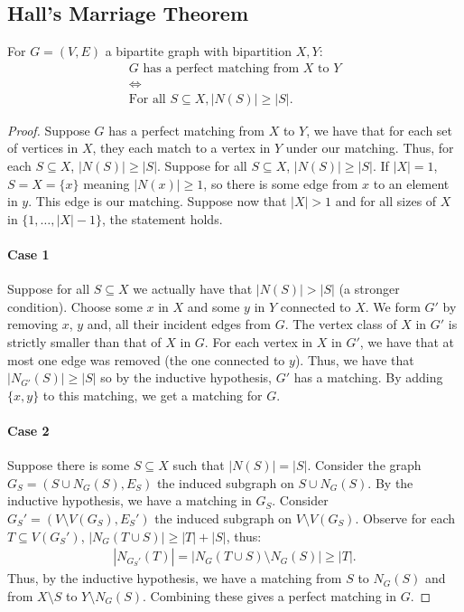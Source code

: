 \newpage

\subsection{Hall's Marriage Theorem}

For $G = (V, E)$ a bipartite graph with bipartition $X, Y$: \begin{gather*}
  G \text{ has a perfect matching from } X \text{ to } Y \\
  \Longleftrightarrow \\
  \text{For all } S \subseteq X, |N(S)| \geq |S|.
\end{gather*}
\begin{proof}
  Suppose $G$ has a perfect matching from $X$ to $Y$, we have that
  for each set of vertices in $X$, they each match to a
  vertex in $Y$ under our matching. Thus, for each $S \subseteq X$,
  $|N(S)| \geq |S|$. Suppose for all $S \subseteq X$, 
  $|N(S)| \geq |S|$. If $|X| = 1$, $S = X = \{x\}$ meaning
  $|N(x)| \geq 1$, so there is some edge from $x$ to an
  element in $y$. This edge is our matching.
  Suppose now that $|X| > 1$ and for all sizes of $X$ in
  $\{1, \ldots, |X| - 1\}$, the statement holds.
  \paragraph{Case 1}
  Suppose for all $S \subseteq X$ we actually have that 
  $|N(S)| > |S|$ (a stronger condition). Choose some
  $x$ in $X$ and some $y$ in $Y$ connected to $X$. We
  form $G'$ by removing $x$, $y$ and, all their incident
  edges from $G$. The vertex class of $X$ in $G'$
  is strictly smaller than that of $X$ in $G$. For
  each vertex in $X$ in $G'$, we have that at most
  one edge was removed (the one connected to $y$).
  Thus, we have that $|N_{G'}(S)| \geq |S|$ so by the
  inductive hypothesis, $G'$ has a matching. By adding
  $\{x, y\}$ to this matching, we get a matching for $G$.
  \paragraph{Case 2}
  Suppose there is some $S \subseteq X$ such that $|N(S)| = |S|$.
  Consider the graph $G_S = (S \cup N_G(S), E_S)$ the induced
  subgraph on $S \cup N_G(S)$. By the inductive hypothesis,
  we have a matching in $G_S$. Consider 
  $G_S' = (V \setminus V(G_S), E_S')$ the induced subgraph on
  $V \setminus V(G_S)$. Observe for each $T \subseteq V(G_S')$,
  $|N_G(T \cup S)| \geq |T| + |S|$, thus: \begin{gather*}
      |N_{G_S'}(T)| = |N_G(T \cup S) \setminus N_G(S)| \geq |T|.
  \end{gather*} Thus, by the inductive hypothesis, we have a matching
  from $S$ to $N_G(S)$ and from $X \setminus S$ to $Y \setminus N_G(S)$.
  Combining these gives a perfect matching in $G$. 
\end{proof}